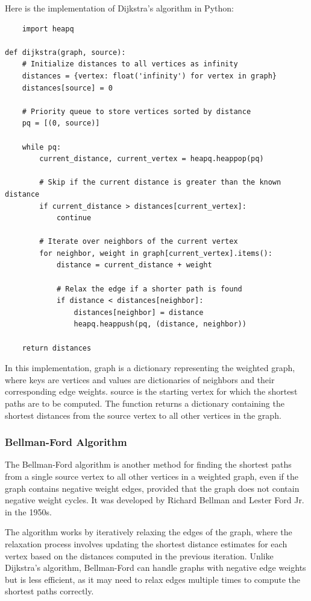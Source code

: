 \documentclass[12pt]{book} %
\begin{document}
Here is the implementation of Dijkstra's algorithm in Python:
\FloatBarrier
\begin{lstlisting}
    import heapq

def dijkstra(graph, source):
    # Initialize distances to all vertices as infinity
    distances = {vertex: float('infinity') for vertex in graph}
    distances[source] = 0
    
    # Priority queue to store vertices sorted by distance
    pq = [(0, source)]
    
    while pq:
        current_distance, current_vertex = heapq.heappop(pq)
        
        # Skip if the current distance is greater than the known distance
        if current_distance > distances[current_vertex]:
            continue
            
        # Iterate over neighbors of the current vertex
        for neighbor, weight in graph[current_vertex].items():
            distance = current_distance + weight
            
            # Relax the edge if a shorter path is found
            if distance < distances[neighbor]:
                distances[neighbor] = distance
                heapq.heappush(pq, (distance, neighbor))
    
    return distances
\end{lstlisting}
In this implementation, graph is a dictionary representing the weighted graph, where keys are vertices and values are dictionaries of neighbors and their corresponding edge weights. source is the starting vertex for which the shortest paths are to be computed. The function returns a dictionary containing the shortest distances from the source vertex to all other vertices in the graph.

\subsubsection{Bellman-Ford Algorithm}
The Bellman-Ford algorithm is another method for finding the shortest paths from a single source vertex to all other vertices in a weighted graph, even if the graph contains negative weight edges, provided that the graph does not contain negative weight cycles. It was developed by Richard Bellman and Lester Ford Jr. in the 1950s.

The algorithm works by iteratively relaxing the edges of the graph, where the relaxation process involves updating the shortest distance estimates for each vertex based on the distances computed in the previous iteration. Unlike Dijkstra's algorithm, Bellman-Ford can handle graphs with negative edge weights but is less efficient, as it may need to relax edges multiple times to compute the shortest paths correctly.
\end{document}
